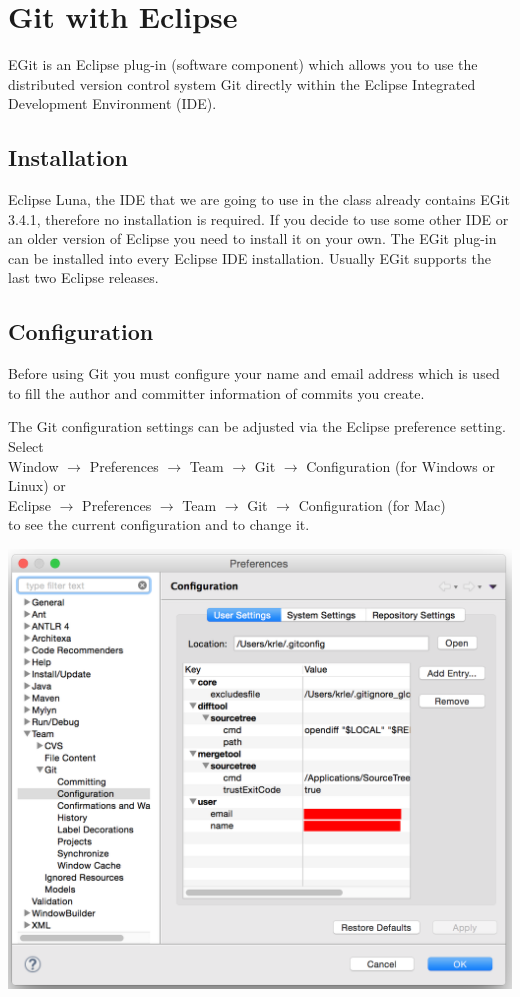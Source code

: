 \documentclass{article}
\begin{document}
\newpage
\section{Git with Eclipse}

EGit is an Eclipse plug-in (software component) which allows you to
use the distributed version control system Git directly within the
Eclipse Integrated Development Environment (IDE). 

\subsection{Installation}
Eclipse Luna, the IDE that we are going to use in the class already contains
EGit 3.4.1, therefore no installation is required. If you decide to
use some other IDE or an older version of Eclipse you need to install
it on your own.
The EGit plug-in can be installed into every Eclipse IDE
installation. Usually EGit supports the last two Eclipse releases.

\subsection{Configuration}

Before using Git you must configure your name and email address which
is used to fill the author and committer information of commits you
create. 

The Git configuration settings can be adjusted via the Eclipse
preference setting. 
Select \\
Window $\rightarrow$ Preferences $\rightarrow$ Team
$\rightarrow$ Git $\rightarrow$ Configuration  (for Windows or Linux)
or\\
Eclipse $\rightarrow$ Preferences $\rightarrow$ Team
$\rightarrow$ Git $\rightarrow$ Configuration (for Mac)\\
to see the current configuration and to change it. 

\begin{center}
\includegraphics[scale=0.5]{figures/s3.png}
\end{center}
\end{document}
